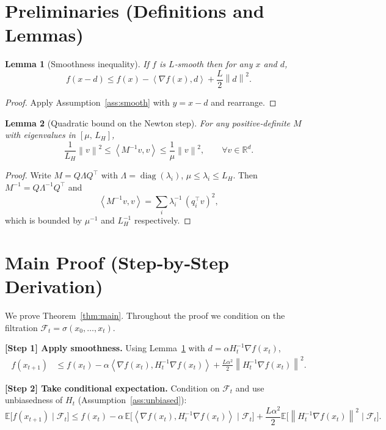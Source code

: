 \documentclass{article}
\newtheorem{lemma}{Lemma}
\newcommand{\E}{\mathbb{E}}
\newcommand{\R}{\mathbb{R}}
\newcommand{\norm}[1]{\left\lVert #1 \right\rVert}
\newcommand{\ip}[2]{\left\langle #1, #2 \right\rangle}
\begin{document}
\newpage
\section*{Preliminaries (Definitions and Lemmas)}
\begin{lemma}[Smoothness inequality]\label{lem:smooth}
If $f$ is $L$‑smooth then for any $x$ and $d$,
\[
f(x-d)\le f(x)-\ip{\nabla f(x)}{d}+\frac{L}{2}\norm{d}^{2}.
\]
\end{lemma}
\begin{proof}
Apply Assumption~\ref{ass:smooth} with $y=x-d$ and rearrange. \hfill\qedsymbol
\end{proof}

\begin{lemma}[Quadratic bound on the Newton step]\label{lem:newton}
For any positive‑definite $M$ with eigenvalues in $[\mu,\,L_{H}]$,
\[
\frac{1}{L_{H}}\norm{v}^{2}\le \ip{M^{-1}v}{v}\le\frac{1}{\mu}\norm{v}^{2},\qquad\forall v\in\R^{d}.
\]
\end{lemma}
\begin{proof}
Write $M=Q\Lambda Q^{\top}$ with $\Lambda=\operatorname{diag}(\lambda_{i})$, $\mu\le\lambda_{i}\le L_{H}$. Then $M^{-1}=Q\Lambda^{-1}Q^{\top}$ and
\[
\ip{M^{-1}v}{v}= \sum_{i}\lambda_{i}^{-1}\,(q_{i}^{\top}v)^{2},
\]
which is bounded by $\mu^{-1}$ and $L_{H}^{-1}$ respectively. \hfill\qedsymbol
\end{proof}

\section*{Main Proof (Step‑by‑Step Derivation)}
We prove Theorem~\ref{thm:main}. Throughout the proof we condition on the filtration $\mathcal{F}_{t}=\sigma(x_{0},\dots,x_{t})$.

\bigskip
\noindent\textbf{[Step 1] Apply smoothness.}  
Using Lemma~\ref{lem:smooth} with $d=\alpha H_{t}^{-1}\nabla f(x_{t})$,
\begin{align}
f(x_{t+1})
&\le f(x_{t})-\alpha\ip{\nabla f(x_{t})}{H_{t}^{-1}\nabla f(x_{t})}
      +\frac{L\alpha^{2}}{2}\norm{H_{t}^{-1}\nabla f(x_{t})}^{2}.
\tag{2}
\end{align}

\noindent\textbf{[Step 2] Take conditional expectation.}  
Condition on $\mathcal{F}_{t}$ and use unbiasedness of $H_{t}$ (Assumption~\ref{ass:unbiased}):
\[
\E\!\bigl[f(x_{t+1})\mid\mathcal{F}_{t}\bigr]
\le f(x_{t})
-\alpha\,\E\!\bigl[\ip{\nabla f(x_{t})}{H_{t}^{-1}\nabla f(x_{t})}\mid\mathcal{F}_{t}\bigr]
+\frac{L\alpha^{2}}{2}\E\!\bigl[\norm{H_{t}^{-1}\nabla f(x_{t})}^{2}\mid\mathcal{F}_{t}\bigr].
\tag{3}
\]
\end{document}
